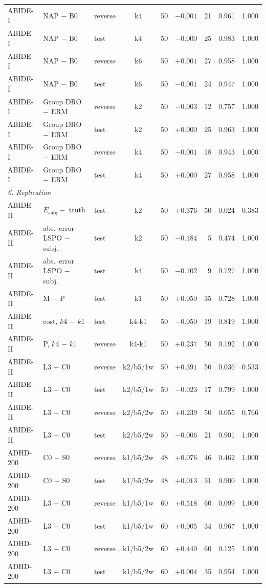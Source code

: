 \begin{longtable}{lllcrrrrr}
ABIDE-I & NAP $-$ B0 & reverse & k4 & 50 & $-0.001$ & 21 & 0.961 & 1.000\\
ABIDE-I & NAP $-$ B0 & test & k4 & 50 & $-0.000$ & 25 & 0.983 & 1.000\\
ABIDE-I & NAP $-$ B0 & reverse & k6 & 50 & $+0.001$ & 27 & 0.958 & 1.000\\
ABIDE-I & NAP $-$ B0 & test & k6 & 50 & $-0.001$ & 24 & 0.947 & 1.000\\
ABIDE-I & Group DRO $-$ ERM & reverse & k2 & 50 & $-0.003$ & 12 & 0.757 & 1.000\\
ABIDE-I & Group DRO $-$ ERM & test & k2 & 50 & $+0.000$ & 25 & 0.963 & 1.000\\
ABIDE-I & Group DRO $-$ ERM & reverse & k4 & 50 & $-0.001$ & 18 & 0.943 & 1.000\\
ABIDE-I & Group DRO $-$ ERM & test & k4 & 50 & $+0.000$ & 27 & 0.958 & 1.000\\
\multicolumn{9}{l}{\textit{6. Replication}}\\
ABIDE-II & $E_{\mathrm{subj}}-$ truth & test & k2 & 50 & $+0.376$ & 50 & 0.024 & 0.383\\
ABIDE-II & abs.\ error LSPO $-$ subj. & test & k2 & 50 & $-0.184$ & 5 & 0.474 & 1.000\\
ABIDE-II & abs.\ error LSPO $-$ subj. & test & k4 & 50 & $-0.102$ & 9 & 0.727 & 1.000\\
ABIDE-II & M $-$ P & test & k1 & 50 & $+0.050$ & 35 & 0.728 & 1.000\\
ABIDE-II & cost, $k$4 $-$ $k$1 & test & k4-k1 & 50 & $-0.050$ & 19 & 0.819 & 1.000\\
ABIDE-II & P, $k$4 $-$ $k$1 & reverse & k4-k1 & 50 & $+0.237$ & 50 & 0.192 & 1.000\\
ABIDE-II & L3 $-$ C0 & reverse & k2/b5/1w & 50 & $+0.391$ & 50 & 0.036 & 0.533\\
ABIDE-II & L3 $-$ C0 & test & k2/b5/1w & 50 & $-0.023$ & 17 & 0.799 & 1.000\\
ABIDE-II & L3 $-$ C0 & reverse & k2/b5/2w & 50 & $+0.239$ & 50 & 0.055 & 0.766\\
ABIDE-II & L3 $-$ C0 & test & k2/b5/2w & 50 & $-0.006$ & 21 & 0.901 & 1.000\\
ADHD-200 & C0 $-$ S0 & reverse & k1/b5/2w & 48 & $+0.076$ & 46 & 0.462 & 1.000\\
ADHD-200 & C0 $-$ S0 & test & k1/b5/2w & 48 & $+0.013$ & 31 & 0.900 & 1.000\\
ADHD-200 & L3 $-$ C0 & reverse & k1/b5/1w & 60 & $+0.518$ & 60 & 0.099 & 1.000\\
ADHD-200 & L3 $-$ C0 & test & k1/b5/1w & 60 & $+0.005$ & 34 & 0.967 & 1.000\\
ADHD-200 & L3 $-$ C0 & reverse & k1/b5/2w & 60 & $+0.440$ & 60 & 0.125 & 1.000\\
ADHD-200 & L3 $-$ C0 & test & k1/b5/2w & 60 & $+0.004$ & 35 & 0.954 & 1.000\\
\end{longtable}
